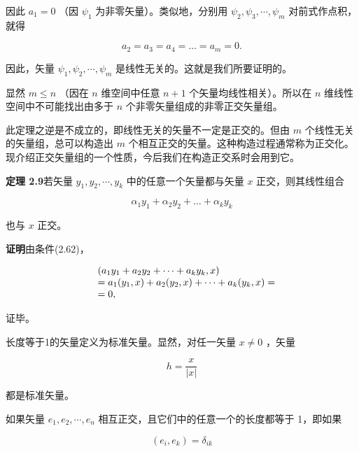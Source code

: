 因此 $a_{1}=0$ （因 $\psi_{1}$ 为非零矢量）。类似地，分别用 $\psi_{2}, \psi_{3}, \cdots, \psi_{m}$ 对前式作点积，就得

\begin{equation*}
a _ {2} = a _ {3} = a _ {4} = \dots = a _ {m} = 0.
\end{equation*}

因此，矢量 $\psi_{1}, \psi_{2}, \cdots, \psi_{m}$ 是线性无关的。这就是我们所要证明的。

显然 $m \leqslant n$ （因在 $n$ 维空间中任意 $n + 1$ 个矢量均线性相关）。所以在 $n$ 维线性空间中不可能找出由多于 $n$ 个非零矢量组成的非零正交矢量组。

此定理之逆是不成立的，即线性无关的矢量不一定是正交的。但由 $m$ 个线性无关的矢量组，总可以构造出 $m$ 个相互正交的矢量。这种构造过程通常称为正交化。现介绍正交矢量组的一个性质，今后我们在构造正交系时会用到它。

\textbf{定理 2.9}\quad 若矢量 $y_{1}, y_{2}, \cdots, y_{k}$ 中的任意一个矢量都与矢量 $x$ 正交，则其线性组合

\begin{equation*}
\alpha_ {1} y _ {1} + \alpha_ {2} y _ {2} + \dots + \alpha_ {k} y _ {k}
\end{equation*}

也与 $x$ 正交。

\textbf{证明}\quad 由条件(2.62)，

\begin{equation*}
\begin{array}{r l} & (a _ {1} y _ {1} + a _ {2} y _ {2} + \dots + a _ {k} y _ {k}, x) \\ & = a _ {1} (y _ {1}, x) + a _ {2} (y _ {2}, x) + \dots + a _ {k} (y _ {k}, x) = \\ & = 0, \end{array}
\end{equation*}

证毕。

长度等于1的矢量定义为标准矢量。显然，对任一矢量 $x \neq 0$ ，矢量

\begin{equation*}
h = \frac {x}{| x |}
\end{equation*}

都是标准矢量。

如果矢量 $e_{1}, e_{2}, \cdots, e_{n}$ 相互正交，且它们中的任意一个的长度都等于 1，即如果

\begin{equation*}
(e _ {i}, e _ {k}) = \delta_ {i k}\tag{2.69}
\end{equation*}

